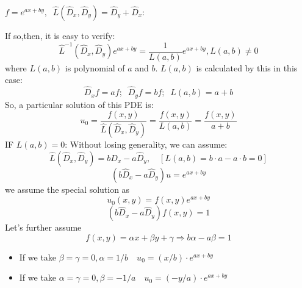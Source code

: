 \documentclass[10pt, a4paper, oneside]{ctexbook}
\begin{document}
$f=e^{ax+by},\;\; \hat{L}\left(\hat{D}_{x}, \hat{D}_{y}\right)=\hat{D}_{y}+\hat{D}_{x}$:

If so,then, it is easy to verify:
$$
\hat{L}^{-1}\left(\hat{D}_{x}, \hat{D}_{y}\right) e^{a x+b y}=\frac{1}{L(a, b)} e^{a x+b y}, L(a, b) \neq 0
$$
where $L(a,b)$ is polynomial of $a$ and $b$.
$L(a,b)$ is calculated by this in this case:
$$
\hat{D}_{x} f = af;\;\;\hat{D}_{y} f= bf;\;\; L(a,b)=a+b
$$
So, a particular solution of this PDE is:
$$
u_0=\frac{f(x,y)}{\hat{L}\left(\hat{D}_{x}, \hat{D}_{y}\right)}=\frac{f(x,y)}{{L}\left(a,b\right)}=\frac{f(x,y)}{a+b}
$$
IF $L(a,b)=0$:
Without losing generality, we can assume:
$$
\hat{L}\left(\hat{D}_{x}, \hat{D}_{y}\right)=b \hat{D}_{x}-a \hat{D}_{y}, \quad[L(a, b)=b \cdot a-a \cdot b=0]
$$
$$\left(b \hat{D}_{x}-a \hat{D}_{y}\right) u=e^{a x+b y}$$
we assume the special solution as 
$$u_{0}(x, y)=f(x, y) e^{a x+b y}$$ 
$$\left(b \hat{D}_{x}-a \hat{D}_{y}\right) f(x, y)=1$$ 
Let's further assume 
$$f(x, y)=\alpha x+\beta y+\gamma \Rightarrow b \alpha-a \beta=1$$
\begin{itemize}
    \item If we take $\beta=\gamma=0, \alpha=1 / b \quad u_{0}=(x / b) \cdot e^{a x+b y}$
    \item If we take $\alpha=\gamma=0, \beta=-1 / a \quad u_{0}=(-y / a) \cdot e^{a x+b y}$    
\end{itemize}
\end{document}
